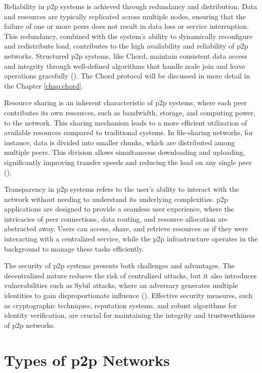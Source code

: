 Reliability in \gls{p2p} systems is achieved through redundancy and distribution.
Data and resources are typically replicated across multiple nodes, ensuring that the failure of one or more peers does not result in data loss or service interruption.
This redundancy, combined with the system's ability to dynamically reconfigure and redistribute load, contributes to the high availability and reliability of \gls{p2p} networks.
Structured \gls{p2p} systems, like Chord, maintain consistent data access and integrity through well-defined algorithms that handle node join and leave operations gracefully (\cite{stoica2001,zarrin2017}).
The Chord protocol will be discussed in more detail in the Chapter \ref{chap:chord}.

Resource sharing is an inherent characteristic of \gls{p2p} systems, where each peer contributes its own resources, such as bandwidth, storage, and computing power, to the network.
This sharing mechanism leads to a more efficient utilization of available resources compared to traditional systems.
In file-sharing networks, for instance, data is divided into smaller chunks, which are distributed among multiple peers.
This division allows simultaneous downloading and uploading, significantly improving transfer speeds and reducing the load on any single peer (\cite{cohen2003incentives}).

Transparency in \gls{p2p} systems refers to the user's ability to interact with the network without needing to understand its underlying complexities.
\gls{p2p} applications are designed to provide a seamless user experience, where the intricacies of peer connections, data routing, and resource allocation are abstracted away.
Users can access, share, and retrieve resources as if they were interacting with a centralized service, while the \gls{p2p} infrastructure operates in the background to manage these tasks efficiently.

The security of \gls{p2p} systems presents both challenges and advantages.
The decentralized nature reduces the risk of centralized attacks, but it also introduces vulnerabilities such as Sybil attacks, where an adversary generates multiple identities to gain disproportionate influence (\cite{Douceur2002}).
Effective security measures, such as cryptographic techniques, reputation systems, and robust algorithms for identity verification, are crucial for maintaining the integrity and trustworthiness of \gls{p2p} networks.

\section{Types of \gls{p2p} Networks}
